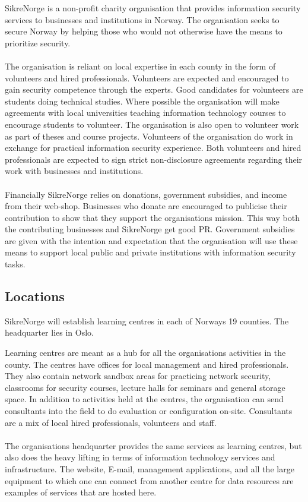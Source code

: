 SikreNorge is a non-profit charity organisation that provides information security services to businesses and institutions in Norway. The organisation seeks to secure Norway by helping those who would not otherwise have the means to prioritize security.
\\
\\
The organisation is reliant on local expertise in each county in the form of volunteers and hired professionals. Volunteers are expected and encouraged to gain security competence through the experts. Good candidates for volunteers are students doing technical studies. Where possible the organisation will make agreements with local universities teaching information technology courses to encourage students to volunteer. The organisation is also open to volunteer work as part of theses and course projects. Volunteers of the organisation do work in exchange for practical information security experience. Both volunteers and hired professionals are expected to sign strict non-disclosure agreements regarding their work with businesses and institutions.
\\
\\
Financially SikreNorge relies on donations, government subsidies, and income from their web-shop. Businesses who donate are encouraged to publicise their contribution to show that they support the organisations mission. This way both the contributing businesses and SikreNorge get good PR. Government subsidies are given with the intention and expectation that the organisation will use these means to support local public and private institutions with information security tasks.

\subsection{Locations}

SikreNorge will establish learning centres in each of Norways 19 counties. The headquarter lies in Oslo.

Learning centres are meant as a hub for all the organisations activities in the county. The centres have offices for local management and hired professionals. They also contain network sandbox areas for practicing network security, classrooms for security courses, lecture halls for seminars and general storage space. In addition to activities held at the centres, the organisation can send consultants into the field to do evaluation or configuration on-site. Consultants are a mix of local hired professionals, volunteers and staff.
\\
\\
The organisations headquarter provides the same services as learning centres, but also does the heavy lifting in terms of information technology services and infrastructure. The website, E-mail, management applications, and all the large equipment to which one can connect from another centre for data resources are examples of services that are hosted here.


